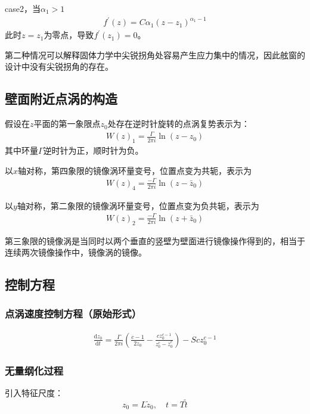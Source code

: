 case2，当$\alpha_{1}>1$
\begin{align*}
    f^{'}(z)=C\alpha_{1}(z-z_{1})^{\alpha_{1}-1}
\end{align*}
此时$z=z_{1}$为零点，导致$f^{'}(z_{1})=0$。

第二种情况可以解释固体力学中尖锐拐角处容易产生应力集中的情况，因此舷窗的设计中没有尖锐拐角的存在。


\subsection{壁面附近点涡的构造}
假设在$z$平面的第一象限点$z_{0}$处存在逆时针旋转的点涡复势表示为：
\begin{align*}
    W(z)_{1} = \frac{\Gamma}{2\pi i}\ln(z-z_{0})
\end{align*}
其中环量$\Gamma$逆时针为正，顺时针为负。

以$x$轴对称，第四象限的镜像涡环量变号，位置点变为共轭，表示为
\begin{align*}
    W(z)_{4}=\frac{-\Gamma}{2\pi i}\ln(z-\bar{z}_{0})
\end{align*}

以$y$轴对称，第二象限的镜像涡环量变号，位置点变为负共轭，表示为
\begin{align*}
    W(z)_{2}=\frac{-\Gamma}{2\pi i}\ln(z+\bar{z}_{0})
\end{align*}

第三象限的镜像涡是当同时以两个垂直的竖壁为壁面进行镜像操作得到的，相当于连续两次镜像操作中，镜像涡的镜像。


\subsection{控制方程}
\subsubsection{点涡速度控制方程（原始形式）}
\begin{align}
    \frac{\mathrm{d}z_{0}}{\mathrm{d}t}=\frac{\Gamma}{2\pi i}\left( \frac{c-1}{2z_{0}} - \frac{cz_{0}^{c-1}}{z_{0}^{c}-\bar{z}_{0}^{c}} \right) - Scz_{0}^{c-1}
\end{align}

\subsubsection{无量纲化过程}

引入特征尺度：
\[
z_0 = L \tilde{z}_0, \quad t = T \tilde{t}
\]

